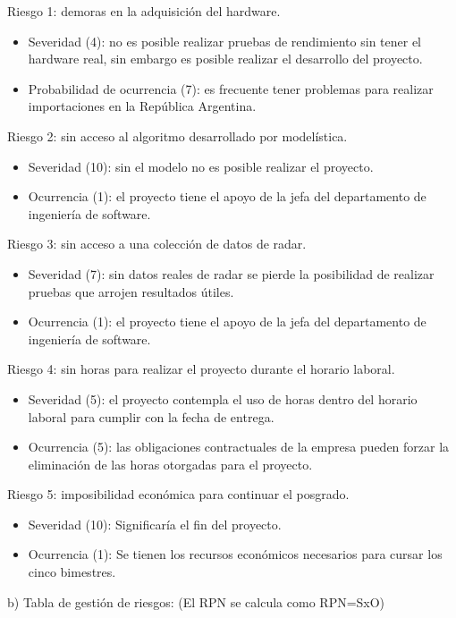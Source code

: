 \documentclass[
11pt, %
]{charter}
\begin{document}
Riesgo 1: demoras en la adquisición del hardware.
\begin{itemize}
\item Severidad (4): no es posible realizar pruebas de rendimiento sin tener el
  hardware real, sin embargo es posible realizar el desarrollo del proyecto.
\item Probabilidad de ocurrencia (7): es frecuente tener problemas para realizar
  importaciones en la República Argentina. 
\end{itemize}   

Riesgo 2: sin acceso al algoritmo desarrollado por modelística.
\begin{itemize}
\item Severidad (10): sin el modelo no es posible realizar el proyecto.
\item Ocurrencia (1): el proyecto tiene el apoyo de la jefa del departamento de
  ingeniería de software.
\end{itemize}

Riesgo 3: sin acceso a una colección de datos de radar.
\begin{itemize}
\item Severidad (7): sin datos reales de radar se pierde la posibilidad
  de realizar pruebas que arrojen resultados útiles.
\item Ocurrencia (1): el proyecto tiene el apoyo de la jefa del departamento de
  ingeniería de software.
\end{itemize}

Riesgo 4: sin horas para realizar el proyecto durante el horario laboral.
\begin{itemize}
\item Severidad (5): el proyecto contempla el uso de horas dentro del horario
  laboral para cumplir con la fecha de entrega.
\item Ocurrencia (5): las obligaciones contractuales de la empresa pueden forzar
  la eliminación de las horas otorgadas para el proyecto.
\end{itemize}

Riesgo 5: imposibilidad económica para continuar el posgrado.
\begin{itemize}
\item Severidad (10): Significaría el fin del proyecto.
\item Ocurrencia (1): Se tienen los recursos económicos necesarios para cursar
  los cinco bimestres.
\end{itemize}


b) Tabla de gestión de riesgos:      (El RPN se calcula como RPN=SxO)
\end{document}
